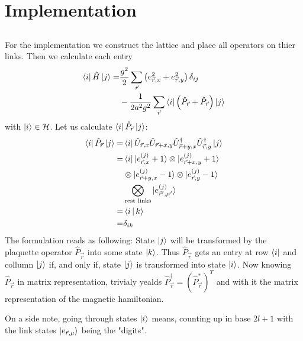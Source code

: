 \section{Implementation}
\subsection{}

For the implementation we construct the lattice and place all operators on thier links. Then we calculate each entry
\begin{align*}
	\bra{i}\hat{H}\ket{j} = & \frac{g^2}{2}\sum_{\vec{r}}\left(e_{\vec{r}, x}^2+e_{\vec{r}, y}^2\right)\delta_{ij}           \\
	                        & -\frac{1}{2a^2g^2}\sum_{\vec{r}}\bra{i}\left(\hat{P}_{\vec{r}}+\hat{P}_{\vec{r}}\right)\ket{j}
\end{align*}
with $\ket{i}\in\cal{H}$. Let us calculate $\bra{i}\hat{P}_{\vec{r}}\ket{j}$:
\begin{align*}
	\bra{i}\hat{P}_{\vec{r}}\ket{j}= & \bra{i}\hat{U}_{\vec{r}, x}\hat{U}_{\vec{r}+x,y}\hat{U}^{\dag}_{\vec{r}+y,x}\hat{U}^{\dag}_{\vec{r},y}\ket{j} \\
	=                                & \bra{i}\ket{e^{(j)}_{\vec{r}, x}+1}\otimes\ket{e^{(j)}_{\vec{r}+x, y}+1}                                      \\
	                                 & \otimes\ket{e^{(j)}_{\vec{r}+y, x}-1}\otimes\ket{e^{(j)}_{\vec{r}, y}-1}                                      \\
	                                 & \bigotimes_\text{rest links}\ket{e^{(j)}_{\vec{r}', \mu'}}                                                          \\
	=                                & \Braket{i|k}                                                                                                  \\
	=                                & \delta_{ik}
\end{align*}
The formulation reads as following: State $\ket{j}$ will be transformed by the plaquette operator $\hat{P}_{\vec{r}}$ into some state $\ket{k}$. Thus $\hat{P}_{\vec{r}}$ gets an entry at row $\bra{i}$ and collumn $\ket{j}$ if, and only if, state $\ket{j}$ is transformed into state $\ket{i}$. Now knowing $\hat{P}_{\vec{r}}$ in matrix representation, trivialy yealds $\hat{P}_{\vec{r}}^{\dag}=\left(\hat{P}_{\vec{r}}^{*}\right)^{T}$ and with it the matrix representation of the magnetic hamiltonian.

On a side note, going through states $\ket{i}$ means, counting up in base $2l+1$ with the link states $\ket{e_{\vec{r}, \mu}}$ being the "digits".

